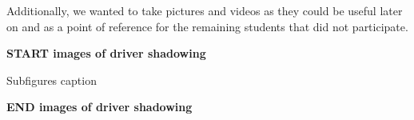 Additionally, we wanted to take pictures and videos as they could be
useful later on and as a point of reference for the remaining students
that did not participate.

\textbf{START images of driver shadowing}

\begin{pandoccrossrefsubfigures}

\hfill
{}

\caption[{Subfigures caption}]{Subfigures caption}

\label{fig:chainge_driver}

\end{pandoccrossrefsubfigures}

\textbf{END images of driver shadowing}

